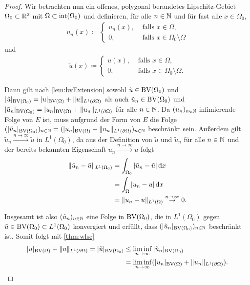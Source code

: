 \begin{proof}
  \medbreak
  Wir betrachten nun ein offenes, polygonal berandetes Lipschitz-Gebiet
  $\Omega_0\subset\mathbb{R}^2$ mit 
  $\Omega\subset\operatorname{int}(\Omega_0)$ und definieren, für alle
  $n\in\mathbb{N}$ und für fast alle 
  $x\in\Omega_0$,
  \begin{align*}
    \tilde{u}_n(x)\coloneqq
    \begin{cases}
      u_n(x),  &\text{ falls } x\in\Omega,\\
      0,     &\text{ falls } x\in\Omega_0\setminus\Omega
    \end{cases} 
  \end{align*}
  und
  \begin{align*}
    \tilde{u}(x)\coloneqq
    \begin{cases}
      u(x),  &\text{ falls } x\in\Omega,\\
      0,     &\text{ falls } x\in\Omega_0\setminus\Omega.
    \end{cases} 
  \end{align*}

  Dann gilt nach \cref{lem:bvExtension} sowohl $\tilde{u}\in\textup{BV}(\Omega_0)$ und
  $|\tilde{u}|_{\textup{BV}\left(\Omega_0\right)} = |u|_{\textup{BV}(\Omega)}+\Vert
  u\Vert_{L^1(\partial\Omega)}$ als auch $\tilde{u}_n\in\textup{BV}(\Omega_0)$
   und
   $|\tilde{u}_n|_{\textup{BV}\left(\Omega_0\right)}
  = |u_n|_{\textup{BV}(\Omega)}+\Vert u_n\Vert_{L^1(\partial\Omega)}$ für alle
  $n\in\mathbb{N}$.
  Da $(u_n)_{n\in \mathbb{N}}$ infimierende Folge von $E$ ist, muss aufgrund der
  Form von $E$ die Folge
  $(|\tilde{u}_n|_{\textup{BV}(\Omega_0)})_{n\in\mathbb{N}} = (|u_n|_{\textup{BV}(\Omega)}+\Vert
  u_n\Vert_{L^1(\partial\Omega)})_{n\in\mathbb{N}}$
  beschränkt sein.
  Außerdem gilt $\tilde{u}_n \overset{n\to\infty}{\to} \tilde{u}$ in
  $L^1(\Omega_0)$, da aus der Definition von $\tilde{u}$ und 
  $\tilde{u}_n$ für alle $n\in\mathbb{N}$ und der bereits bekannten Eigenschaft 
  $u_n\overset{n\to\infty}{\to} u$ folgt
  \begin{align*}
    \Vert \tilde{u}_n - \tilde{u}\Vert_{L^1(\Omega_0)} 
    &= \int_{\Omega_0} |\tilde{u}_n - \tilde{u}|\,\mathrm{d}x\\
    &= \int_\Omega |u_n - u|\,\mathrm{d}x\\
    &= \Vert u_n - u\Vert_{L^1(\Omega)} \overset{n\to\infty}{\to} 0.
  \end{align*}

  Insgesamt ist also $(\tilde{u}_n)_{n\in\mathbb{N}}$ eine Folge in $\textup{BV}(\Omega_0)$,
  die in $L^1(\Omega_0)$ gegen $\tilde{u}\in\textup{BV}(\Omega_0)\subset
  L^1(\Omega_0)$ konvergiert und 
  erfüllt, dass $(|\tilde{u}_n|_{\textup{BV}(\Omega_0)})_{n\in\mathbb{N}}$ beschränkt
  ist. Somit folgt mit
  \cref{thm:wlsc}  
  \begin{equation}
    \label{eq:wlscOfExtension}
    \begin{aligned}
      |u|_{\textup{BV}(\Omega)} +\Vert u\Vert_{L^1(\partial\Omega)}
      = |\tilde{u}|_{\textup{BV}(\Omega_0)}
      &\leq\liminf_{n\to\infty} |\tilde{u}_n|_{\textup{BV}(\Omega_0)}\\
      &= \liminf_{n\to\infty} (|u_n|_{\textup{BV}(\Omega)} +
      \Vert u_n\Vert_{L^1(\partial\Omega)}).
    \end{aligned}
  \end{equation}


\end{proof}
